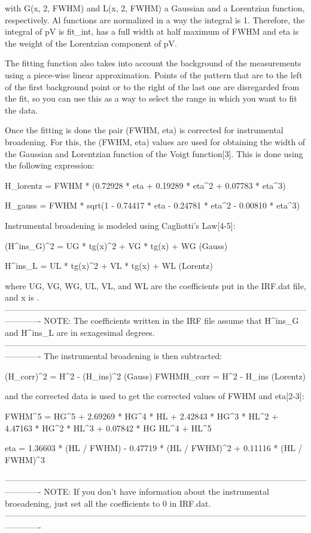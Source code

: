 with G(x, 2\theta, FWHM) and L(x, 2\theta, FWHM) a Gaussian and a Lorentzian function, respectively. Al functions are normalized in a way the integral is 1. Therefore, the integral of pV is fit_int, has a full width at half maximum of FWHM and eta is the weight of the Lorentzian component of pV.

The fitting function also takes into account the background of the measurements using a piece-wise linear approximation. Points of the pattern that are to the left of the first background point or to the right of the last one are disregarded from the fit, so you can use this as a way to select the range in which you want to fit the data.

Once the fitting is done the pair (FWHM, eta) is corrected for instrumental broadening. For this, the (FWHM, eta) values are used for obtaining the width of the Gaussian and Lorentzian function of the Voigt function[3]. This is done using the following expression:

H_{lorentz} = FWHM * (0.72928 * eta + 0.19289 * eta^2 + 0.07783 * eta^3)

H_{gauss} = FWHM * sqrt(1 - 0.74417 * eta - 0.24781 * eta^2 - 0.00810 * eta^3)

Instrumental broadening is modeled using Cagliotti's Law[4-5]:

(H^ins_G)^2 = UG * tg(x)^2 + VG * tg(x) + WG (Gauss)

H^ins_L = UL * tg(x)^2 + VL * tg(x) + WL (Lorentz)

where UG, VG, WG, UL, VL, and WL are the coefficients put in the IRF.dat file, and x is \theta.
-------------------------------------------------------------------------------------------------------------------------
NOTE: The coefficients written in the IRF file assume that H^ins_G and H^ins_L are in sexagesimal degrees.
-------------------------------------------------------------------------------------------------------------------------
The instrumental broadening is then subtracted:

(H_corr)^2 = H^2 - (H_ins)^2 (Gauss)
FWHMH_corr = H^2 - H_ins (Lorentz)

and the corrected data is used to get the corrected values of FWHM and eta[2-3]:

FWHM^5 = HG^5 + 2.69269 * HG^4 * HL + 2.42843 * HG^3 * HL^2 + 4.47163 * HG^2 * HL^3 + 0.07842 * HG HL^4 + HL^5

eta = 1.36603 * (HL / FWHM) - 0.47719 * (HL / FWHM)^2 + 0.11116 * (HL / FWHM)^3

-------------------------------------------------------------------------------------------------------------------------
NOTE: If you don't have information about the instrumental broeadening, just set all the coefficients to 0 in IRF.dat.
-------------------------------------------------------------------------------------------------------------------------
 
